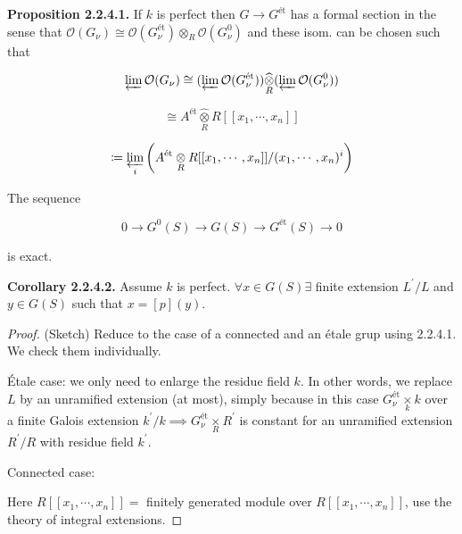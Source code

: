 \documentclass{article}
\theoremstyle{definition}
\numberwithin{theorem}{subsection}
\begin{document}
    \textbf{Proposition 2.2.4.1.} If \(k\) is perfect then \(G  \to G^{\text{\'et}}\) has a formal section in the sense that \(\mathcal{O}(G_\nu) \cong \mathcal{O} (G_{\nu}^{\text{\'et}}) \otimes_R \mathcal{O} (G_\nu^0)\) and these isom. can be chosen such that
    
    \[
        \varprojlim \mathcal{O} (G_\nu) \cong (\varprojlim \mathcal{O}(G_\nu^{\text{\'et}})) \widehat{\underset{R}{\otimes}} (\varprojlim \mathcal{O} (G_\nu^0))
    \]

    \[
        \cong A^{\text{\'et}} \widehat{\underset{R}{\otimes}} R[[x_1, \cdots , x_n]]
    \]

    \[
        \coloneqq \varprojlim_i \left( A^{\text{\'et}} \underset{R}{\otimes} R[[x_1, \cdots , x_n]] / (x_1, \cdots , x_n)^i \right) 
    \]

    The sequence

    \[
        0 \to G^0(S) \to G(S) \to G^{\text{\'et}}(S) \to 0 
    \]

    is exact.


    \textbf{Corollary 2.2.4.2.} Assume \(k\) is perfect. \(\forall x\in G(S) \exists\) finite extension \(L^{\prime} / L\) and \(y\in G(S)\) such that \(x = [p](y)\).
    
    \begin{proof}
        (Sketch) Reduce to the case of a connected and an \'etale grup using 2.2.4.1. We check them individually.

        \'Etale case: we only need to enlarge the residue field \(k\). In other words, we replace \(L\) by an unramified extension (at most), simply because in this case \(G_{\nu}^{\text{\'et}} \underset{k}{\times} k \) over a finite  Galois extension \(k^{\prime} / k \implies G_\nu^{\text{\'et}} \underset{R}{\times} R^{\prime}\) is constant for an unramified extension \(R^{\prime}  / R\) with residue field \(k^{\prime}\).  

        Connected case:

        \begin{center}
        \end{center}

        Here \(R[[x_1, \cdots , x_n]] =\) finitely generated module over \(R[[x_1, \cdots , x_n]]\), use the theory of integral extensions. 
    \end{proof}
\end{document}
